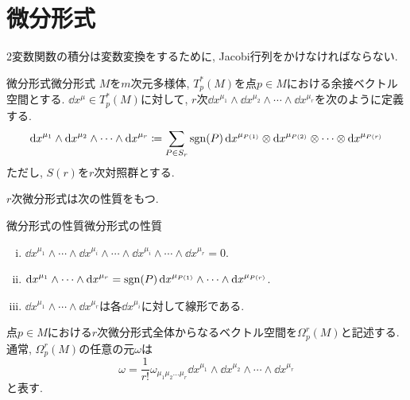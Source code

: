 \documentclass[../main.tex]{subfiles}
\begin{document}

\section{微分形式}
    2変数関数の積分は変数変換をするために,
    Jacobi行列をかけなければならない.
    \begin{dfn}{微分形式}{微分形式}
        $M$を$m$次元多様体, $T_p^*(M)$を点$p \in M$における余接ベクトル空間とする.
        $\dd{x^\mu} \in T_p^*(M)$に対して,
        $r$次$\dd{x}^{\mu_1} \wedge \dd{x}^{\mu_2} \wedge \cdots \wedge \dd{x}^{\mu_r}$を次のように定義する.
        \begin{equation}
            \dd{x}^{\mu_1} \wedge \dd{x}^{\mu_2}
                \wedge \cdots \wedge \dd{x}^{\mu_r}
            \coloneqq \sum_{P \in S_r} \operatorname{sgn}(P)
                    \dd{x}^{\mu_{P(1)}} \otimes \dd{x}^{\mu_{P(2)}}
                        \otimes \cdots \otimes \dd{x}^{\mu_{P(r)}}
        \end{equation}
        ただし, $S(r)$を$r$次対照群とする.
    \end{dfn}
    $r$次微分形式は次の性質をもつ.
    \begin{prop}{微分形式の性質}{微分形式の性質}
        \begin{enumerate}[(i)]
            \item $\dd{x}^{\mu_1} \wedge \cdots
                        \wedge \dd{x}^{\mu_i} \wedge \cdots
                                \wedge \dd{x}^{\mu_i} \wedge \cdots
                                    \wedge \dd{x}^{\mu_r} = 0$.
            \item $\dd{x}^{\mu_1} \wedge \cdots \wedge \dd{x}^{\mu_r}
                    = \operatorname{sgn}(P) \dd{x}^{\mu_{P(1)}} \wedge \cdots
                        \wedge \dd{x}^{\mu_{P(r)}}$.
            \item $\dd{x}^{\mu_1} \wedge \cdots \wedge \dd{x}^{\mu_r}$は各$\dd{x}^{\mu_i}$に対して線形である.
        \end{enumerate}
    \end{prop}
    点$p \in M$における$r$次微分形式全体からなるベクトル空間を$\Omega_p^r(M)$と記述する. 通常, $\Omega_p^r(M)$の任意の元$\omega$は
    \begin{equation}
        \omega = \frac{1}{r!}\omega_{\mu_1\mu_2\ldots\mu_r}
                    \dd{x}^{\mu_1} \wedge \dd{x}^{\mu_2}
                        \wedge \cdots \wedge \dd{x}^{\mu_r}
    \end{equation}
    と表す.
\end{document}

